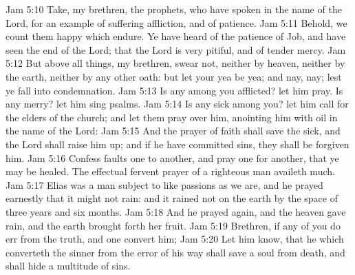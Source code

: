 \vs Jam 5:10 Take, my brethren, the prophets, who have spoken in the name of the Lord, for an example of suffering affliction, and of patience.
\vs Jam 5:11 Behold, we count them happy which endure. Ye have heard of the patience of Job, and have seen the end of the Lord; that the Lord is very pitiful, and of tender mercy.
\vs Jam 5:12 But above all things, my brethren, swear not, neither by heaven, neither by the earth, neither by any other oath: but let your yea be yea; and  nay, nay; lest ye fall into condemnation.
\vs Jam 5:13 Is any among you afflicted? let him pray. Is any merry? let him sing psalms.
\vs Jam 5:14 Is any sick among you? let him call for the elders of the church; and let them pray over him, anointing him with oil in the name of the Lord:
\vs Jam 5:15 And the prayer of faith shall save the sick, and the Lord shall raise him up; and if he have committed sins, they shall be forgiven him.
\vs Jam 5:16 Confess  faults one to another, and pray one for another, that ye may be healed. The effectual fervent prayer of a righteous man availeth much.
\vs Jam 5:17 Elias was a man subject to like passions as we are, and he prayed earnestly that it might not rain: and it rained not on the earth by the space of three years and six months.
\vs Jam 5:18 And he prayed again, and the heaven gave rain, and the earth brought forth her fruit.
\vs Jam 5:19 Brethren, if any of you do err from the truth, and one convert him;
\vs Jam 5:20 Let him know, that he which converteth the sinner from the error of his way shall save a soul from death, and shall hide a multitude of sins.
